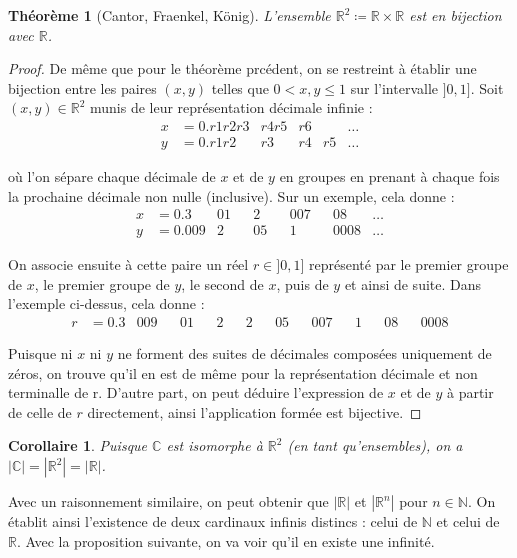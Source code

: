 \documentclass{article}
\theoremstyle{definition}
\theoremstyle{plain}
\newtheorem{theorem}[subsubsection]{Théorème}
\theoremstyle{plain}
\newtheorem{corollary}[subsubsection]{Corollaire}
\theoremstyle{plain}
\theoremstyle{plain}
\begin{document}
\begin{theorem}[Cantor, Fraenkel, König]
	L'ensemble \( \mathbb{R}^{2} \coloneqq \mathbb{R} \times \mathbb{R}\) est en bijection avec \( \mathbb{R} \). \cite{aigner2018proofs} 
\end{theorem}
\begin{proof}
	De même que pour le théorème prcédent, on se restreint à établir une bijection entre les paires \( (x,y) \) telles que \( 0 < x,y \le 1 \) sur l'intervalle \( ]0,1] \).
	Soit \( (x,y) \in \mathbb{R}^{2} \) munis de leur représentation décimale infinie :
	\begin{align*}
		x &= 0.r1r2r3 & r4r5 & r6 & &\ldots\\
		y &= 0.r1r2  & r3 & r4 & r5 &\ldots
	\end{align*}

	où l'on sépare chaque décimale de \( x \) et de \( y \) en groupes en prenant à chaque fois la prochaine décimale non nulle (inclusive). Sur un exemple, cela donne :
	\begin{align*}
		x &= 0.3 & 01 && 2 && 007 && 08 & \ldots\\
		y &= 0.009 & 2 && 05 && 1 && 0008 & \ldots
	\end{align*}

	On associe ensuite à cette paire un réel \( r \in ]0,1] \) représenté par le premier groupe de \( x \), le premier groupe de \( y \), le second de \( x \), puis de \( y \) et ainsi de suite.
	Dans l'exemple ci-dessus, cela donne :
	\begin{align*}
		r &= 0.3 & 009 && 01 && 2 && 2 && 05 && 007 && 1 && 08 && 0008
	\end{align*}

	Puisque ni \( x \) ni \( y \) ne forment des suites de décimales composées uniquement de zéros, on trouve qu'il en est de même pour la représentation décimale et non terminalle de r. 
	D'autre part, on peut déduire l'expression de \( x \) et de \( y \) à partir de celle de \( r \) directement, ainsi l'application formée est bijective.
\end{proof}
\begin{corollary}
	Puisque \( \mathbb{C} \) est isomorphe à \( \mathbb{R}^{2} \) (en tant qu'ensembles), on a \( |\mathbb{C}| = |\mathbb{R}^{2}| = |\mathbb{R}| \).
\end{corollary}

Avec un raisonnement similaire, on peut obtenir que \( |\mathbb{R}| \) et \( |\mathbb{R}^{n}| \) pour \( n \in \mathbb{N} \). \cite{dumoncel2002philosophie}
On établit ainsi l'existence de deux cardinaux infinis distincs : celui de \( \mathbb{N} \) et celui de \( \mathbb{R} \). Avec la proposition suivante, on va voir qu'il en existe une infinité.
\end{document}
